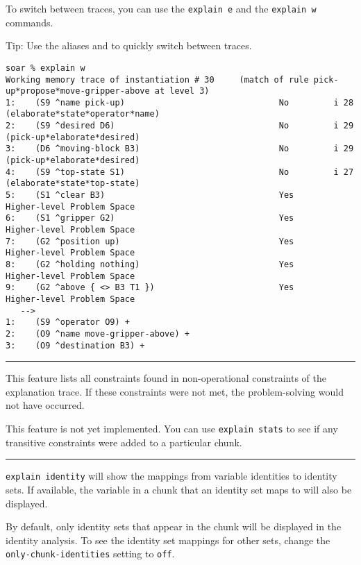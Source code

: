 To switch between traces, you can use the \texttt{explain\ e} and the
\texttt{explain\ w} commands.

Tip: Use the aliases  and  to quickly switch between traces.

{\scriptsize
\begin{verbatim}
soar % explain w
Working memory trace of instantiation # 30     (match of rule pick-up*propose*move-gripper-above at level 3)
1:    (S9 ^name pick-up)                               No         i 28 (elaborate*state*operator*name)
2:    (S9 ^desired D6)                                 No         i 29 (pick-up*elaborate*desired)
3:    (D6 ^moving-block B3)                            No         i 29 (pick-up*elaborate*desired)
4:    (S9 ^top-state S1)                               No         i 27 (elaborate*state*top-state)
5:    (S1 ^clear B3)                                   Yes        Higher-level Problem Space
6:    (S1 ^gripper G2)                                 Yes        Higher-level Problem Space
7:    (G2 ^position up)                                Yes        Higher-level Problem Space
8:    (G2 ^holding nothing)                            Yes        Higher-level Problem Space
9:    (G2 ^above { <> B3 T1 })                         Yes        Higher-level Problem Space
   -->
1:    (S9 ^operator O9) +
2:    (O9 ^name move-gripper-above) +
3:    (O9 ^destination B3) +
\end{verbatim}
}

\rule{\textwidth}{1pt}

\textbf{}

This feature lists all constraints found in non-operational constraints of the explanation trace.
If these constraints were not met, the problem-solving would not have occurred.

This feature is not yet implemented. You can use \texttt{explain\ stats}
to see if any transitive constraints were added to a particular chunk.

\rule{\textwidth}{1pt}

\textbf{}

\texttt{explain\ identity} will show the mappings from variable
identities to identity sets. If available, the variable in a chunk that
an identity set maps to will also be displayed.

By default, only identity sets that appear in the chunk will be
displayed in the identity analysis. To see the identity set mappings for
other sets, change the \texttt{only-chunk-identities} setting to
\texttt{off}.

